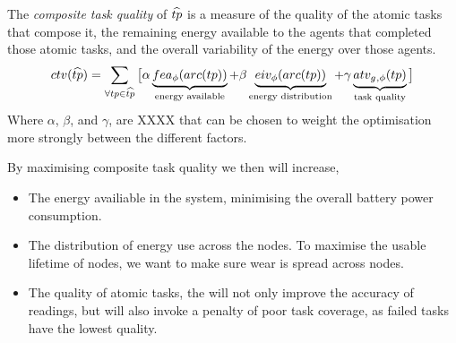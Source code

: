 \begin{definition}
	The \textit{composite task quality} of $\varCompositeTask{}{}$ is a measure of the quality of the atomic tasks that compose it, the remaining energy available to the agents that completed those atomic tasks, and the overall variability of the energy over those agents. 
	\begin{equation}
		\functionCompositeTaskQuality{}{} = 
		\sum_{\forall \varAtomicTask{}{} \in \varCompositeTask{}{}}
		\big\lbrack
		\alpha\underbrace{\functionFractionalEnergyAvailable{\functionTaskArc{}{}}{}}_{\text{energy available}}
		+ \beta\underbrace{\functionEnergyInverseVariability{\functionTaskArc{}{}}{}}_{\text{energy distribution}}
		+ 
		\gamma\underbrace{\functionAtomicTaskQualitySignature{}{}}_{\text{task quality}}
		\big\rbrack
	\end{equation}
Where $\alpha$, $\beta$, and $\gamma$, are XXXX that can be chosen to weight the optimisation more strongly between the different factors.
\end{definition}
By maximising composite task quality we then will increase,
\begin{itemize}
	\item The energy availiable in the system, minimising the overall battery power consumption.
	\item The distribution of energy use across the nodes. To maximise the usable lifetime of nodes, we want to make sure wear is spread across nodes. 
	\item The quality of atomic tasks, the will not only improve the accuracy of readings, but will also invoke a penalty of poor task coverage, as failed tasks have the lowest quality.
\end{itemize}
